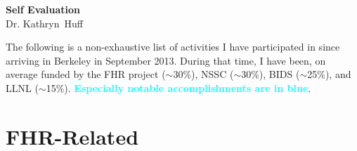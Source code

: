 \documentclass[a4paper, 10pt]{article}
\newcommand{\authorname}{Katy Huff}
\newcommand{\longauthorname}{Dr.  Kathryn~Huff}
\newcommand{\authorsite}{katyhuff.github.io}
\newcommand{\boldblue}[1]{\textcolor{cyan}{\textbf{#1}}}
\begin{document}
\pagestyle{fancy}
\lhead{\textcolor{gray}{\it \authorname}}
\rhead{\textcolor{gray}{\thepage/\totalpages{}}}
\renewcommand{\headrulewidth}{0pt}
\renewcommand{\footrulewidth}{0pt}
\fancyfoot[C]{\footnotesize \textcolor{gray}{\authorsite}}

\begin{center}
{\LARGE \bf Self Evaluation}\\
\vspace*{0.1cm}
{\normalsize \longauthorname}
\end{center}



The following is a non-exhaustive list of activities I have participated in 
since arriving in Berkeley in September 2013. During that time, I have been, on 
average funded by the FHR project ($\sim$30\%), NSSC 
($\sim$30\%), BIDS ($\sim$25\%), and 
LLNL ($\sim$15\%). \boldblue{Especially notable accomplishments are in blue}.

\section*{FHR-Related}
\end{document}
